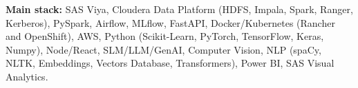 \begin{cvparagraph}
\textbf{Main stack:} SAS Viya, Cloudera Data Platform (HDFS, Impala, Spark, Ranger, Kerberos), PySpark, Airflow, MLflow, FastAPI, Docker/Kubernetes (Rancher and OpenShift), AWS, Python (Scikit-Learn, PyTorch, TensorFlow, Keras, Numpy), Node/React, SLM/LLM/GenAI, Computer Vision, NLP (spaCy, NLTK, Embeddings, Vectors Database, Transformers), Power BI, SAS Visual Analytics.

\end{cvparagraph} 